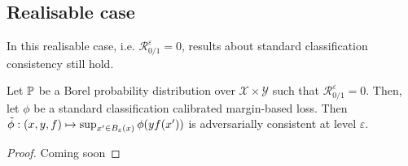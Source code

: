 \subsection{Realisable case}
In this realisable case, i.e. $\mathcal{R}^{\varepsilon}_{0/1} = 0$, results about standard classification consistency still hold.
\begin{prop}
Let $\mathbb{P}$ be a Borel probability distribution over $\mathcal{X}\times\mathcal{Y}$ such that $\mathcal{R}^{\varepsilon}_{0/1} = 0$. Then, let $\phi$ be a standard classification calibrated margin-based loss. Then $\Tilde{\phi}:(x,y,f)\mapsto\sup_{x'\in B_\varepsilon(x)}\phi(yf(x'))$ is adversarially consistent at level $\varepsilon$.
\end{prop}

\begin{proof}
Coming soon
\end{proof}